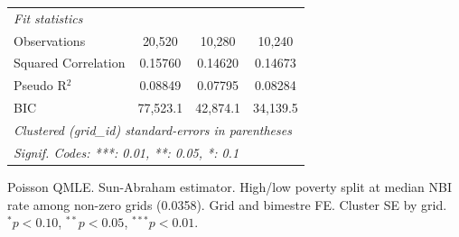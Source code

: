\begin{tabular}{lccc}
   \midrule
   \emph{Fit statistics}\\
   Observations        & 20,520         & 10,280         & 10,240\\  
   Squared Correlation & 0.15760        & 0.14620        & 0.14673\\  
   Pseudo R$^2$        & 0.08849        & 0.07795        & 0.08284\\  
   BIC                 & 77,523.1       & 42,874.1       & 34,139.5\\  
   \midrule \midrule
   \multicolumn{4}{l}{\emph{Clustered (grid\_id) standard-errors in parentheses}}\\
   \multicolumn{4}{l}{\emph{Signif. Codes: ***: 0.01, **: 0.05, *: 0.1}}\\
\end{tabular}
 
\par \raggedright 
Poisson QMLE. Sun-Abraham estimator. High/low poverty split at median NBI rate among non-zero grids (0.0358). Grid and bimestre FE. Cluster SE by grid. $^{*}p<0.10$, $^{**}p<0.05$, $^{***}p<0.01$.
\par\endgroup


